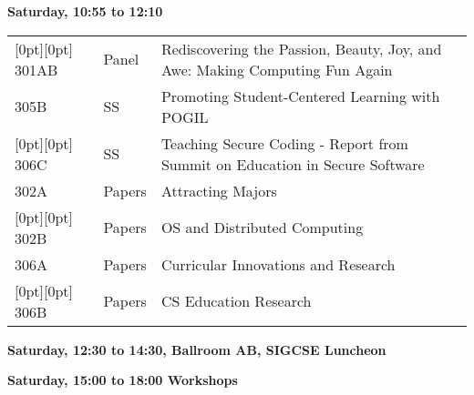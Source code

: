 \noindent
{\sffamily\bfseries Saturday, 10:55 to 12:10}\newline\noindent
\begin{tabular*}{5in}{@{}p{0.5in}@{}p{0.75in}@{}p{3.75in}}

\rowcolor[gray]{0.9}[0pt][0pt] 301AB & Panel & Rediscovering the Passion, Beauty, Joy, and Awe:  Making Computing Fun Again \\

305B & SS & Promoting Student-Centered Learning with POGIL \\

\rowcolor[gray]{0.9}[0pt][0pt] 306C & SS & Teaching Secure Coding - Report from Summit on Education in Secure Software \\

302A & Papers & Attracting Majors \\

\rowcolor[gray]{0.9}[0pt][0pt] 302B & Papers & OS and Distributed Computing \\

306A & Papers & Curricular Innovations and Research \\

\rowcolor[gray]{0.9}[0pt][0pt] 306B & Papers & CS Education Research \\


\end{tabular*}\newline

\noindent
{\sffamily\bfseries Saturday, 12:30 to 14:30, Ballroom AB, SIGCSE Luncheon}\newline
\hspace*{48pt}{\sffamily\bfseries Keynote: Fernanda Viégas and Martin Wattenberg }\newline\noindent

\noindent
{\sffamily\bfseries Saturday, 15:00 to 18:00 Workshops}\newline\noindent

